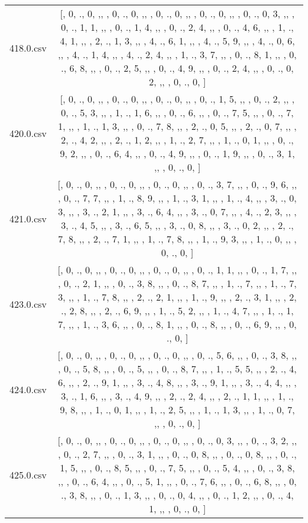 \begin{table}[ht]
\begin{tabular}{@{}c c@{}}
	418.0.csv & [, 0, ., 0, ,,  , 0, ., 0, ,,  , 0, ., 0, ,,  , 0, ., 0, ,,  , 0, ., 0, 3, ,,  , 0, ., 1, 1, ,,  , 0, ., 1, 4, ,,  , 0, ., 2, 4, ,,  , 0, ., 4, 6, ,,  , 1, ., 4, 1, ,,  , 2, ., 1, 3, ,,  , 4, ., 6, 1, ,,  , 4, ., 5, 9, ,,  , 4, ., 0, 6, ,,  , 4, ., 1, 4, ,,  , 4, ., 2, 4, ,,  , 1, ., 3, 7, ,,  , 0, ., 8, 1, ,,  , 0, ., 6, 8, ,,  , 0, ., 2, 5, ,,  , 0, ., 4, 9, ,,  , 0, ., 2, 4, ,,  , 0, ., 0, 2, ,,  , 0, ., 0, ]\\ 
	420.0.csv & [, 0, ., 0, ,,  , 0, ., 0, ,,  , 0, ., 0, ,,  , 0, ., 1, 5, ,,  , 0, ., 2, ,,  , 0, ., 5, 3, ,,  , 1, ., 1, 6, ,,  , 0, ., 6, ,,  , 0, ., 7, 5, ,,  , 0, ., 7, 1, ,,  , 1, ., 1, 3, ,,  , 0, ., 7, 8, ,,  , 2, ., 0, 5, ,,  , 2, ., 0, 7, ,,  , 2, ., 4, 2, ,,  , 2, ., 1, 2, ,,  , 1, ., 2, 7, ,,  , 1, ., 0, 1, ,,  , 0, ., 9, 2, ,,  , 0, ., 6, 4, ,,  , 0, ., 4, 9, ,,  , 0, ., 1, 9, ,,  , 0, ., 3, 1, ,,  , 0, ., 0, ]\\ 
	421.0.csv & [, 0, ., 0, ,,  , 0, ., 0, ,,  , 0, ., 0, ,,  , 0, ., 3, 7, ,,  , 0, ., 9, 6, ,,  , 0, ., 7, 7, ,,  , 1, ., 8, 9, ,,  , 1, ., 3, 1, ,,  , 1, ., 4, ,,  , 3, ., 0, 3, ,,  , 3, ., 2, 1, ,,  , 3, ., 6, 4, ,,  , 3, ., 0, 7, ,,  , 4, ., 2, 3, ,,  , 3, ., 4, 5, ,,  , 3, ., 6, 5, ,,  , 3, ., 0, 8, ,,  , 3, ., 0, 2, ,,  , 2, ., 7, 8, ,,  , 2, ., 7, 1, ,,  , 1, ., 7, 8, ,,  , 1, ., 9, 3, ,,  , 1, ., 0, ,,  , 0, ., 0, ]\\ 
	423.0.csv & [, 0, ., 0, ,,  , 0, ., 0, ,,  , 0, ., 0, ,,  , 0, ., 1, 1, ,,  , 0, ., 1, 7, ,,  , 0, ., 2, 1, ,,  , 0, ., 3, 8, ,,  , 0, ., 8, 7, ,,  , 1, ., 7, ,,  , 1, ., 7, 3, ,,  , 1, ., 7, 8, ,,  , 2, ., 2, 1, ,,  , 1, ., 9, ,,  , 2, ., 3, 1, ,,  , 2, ., 2, 8, ,,  , 2, ., 6, 9, ,,  , 1, ., 5, 2, ,,  , 1, ., 4, 7, ,,  , 1, ., 1, 7, ,,  , 1, ., 3, 6, ,,  , 0, ., 8, 1, ,,  , 0, ., 8, ,,  , 0, ., 6, 9, ,,  , 0, ., 0, ]\\ 
	424.0.csv & [, 0, ., 0, ,,  , 0, ., 0, ,,  , 0, ., 0, ,,  , 0, ., 5, 6, ,,  , 0, ., 3, 8, ,,  , 0, ., 5, 8, ,,  , 0, ., 5, ,,  , 0, ., 8, 7, ,,  , 1, ., 5, 5, ,,  , 2, ., 4, 6, ,,  , 2, ., 9, 1, ,,  , 3, ., 4, 8, ,,  , 3, ., 9, 1, ,,  , 3, ., 4, 4, ,,  , 3, ., 1, 6, ,,  , 3, ., 4, 9, ,,  , 2, ., 2, 4, ,,  , 2, ., 1, 1, ,,  , 1, ., 9, 8, ,,  , 1, ., 0, 1, ,,  , 1, ., 2, 5, ,,  , 1, ., 1, 3, ,,  , 1, ., 0, 7, ,,  , 0, ., 0, ]\\ 
	425.0.csv & [, 0, ., 0, ,,  , 0, ., 0, ,,  , 0, ., 0, ,,  , 0, ., 0, 3, ,,  , 0, ., 3, 2, ,,  , 0, ., 2, 7, ,,  , 0, ., 3, 1, ,,  , 0, ., 0, 8, ,,  , 0, ., 0, 8, ,,  , 0, ., 1, 5, ,,  , 0, ., 8, 5, ,,  , 0, ., 7, 5, ,,  , 0, ., 5, 4, ,,  , 0, ., 3, 8, ,,  , 0, ., 6, 4, ,,  , 0, ., 5, 1, ,,  , 0, ., 7, 6, ,,  , 0, ., 6, 8, ,,  , 0, ., 3, 8, ,,  , 0, ., 1, 3, ,,  , 0, ., 0, 4, ,,  , 0, ., 1, 2, ,,  , 0, ., 4, 1, ,,  , 0, ., 0, ]\\ 

\end{tabular}
\end{table}
